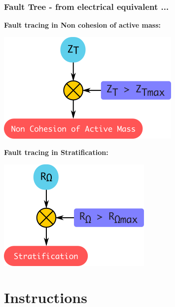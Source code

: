 \documentclass{beamer}
\begin{document}
\begin{frame}     %
  \frametitle{Fault Tree - from electrical equivalent ...}
  \fontsize{8pt}{10}\selectfont
  \textbf{Fault tracing in Non cohesion of active mass:}
  \vspace{-5pt}
  \begin{center}
    \includegraphics[width=0.4\linewidth]{./Resources/Images/analysis_faulttree_noncohesionactivemass.png}
  \end{center}
  \textbf{Fault tracing in Stratification:}
  \vspace{-10pt}  
  \begin{center}
    \includegraphics[width=0.35\linewidth]{./Resources/Images/analysis_faulttree_stratification.png}
  \end{center}
\end{frame}



\section{Instructions}

{ %
    \begin{frame}[plain]
     \end{frame}
}
\end{document}

